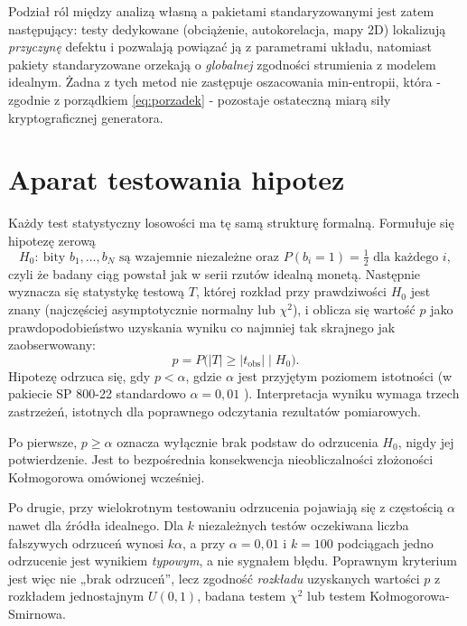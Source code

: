 Podział ról między analizą własną a pakietami standaryzowanymi jest zatem
następujący: testy dedykowane (obciążenie, autokorelacja, mapy 2D)
lokalizują \emph{przyczynę} defektu i pozwalają powiązać ją z parametrami
układu, natomiast pakiety standaryzowane orzekają o \emph{globalnej}
zgodności strumienia z modelem idealnym. Żadna z tych metod nie zastępuje
oszacowania min-entropii, która - zgodnie z porządkiem
\eqref{eq:porzadek} - pozostaje ostateczną miarą siły kryptograficznej
generatora.

\section{Aparat testowania hipotez}

Każdy test statystyczny losowości ma tę samą strukturę formalną. Formułuje
się hipotezę zerową
%
\begin{equation}
  H_0:\ \text{bity } b_1,\dots,b_N \text{ są wzajemnie niezależne oraz }
  P(b_i = 1) = \tfrac{1}{2} \text{ dla każdego } i,
  \label{eq:h0}
\end{equation}
%
czyli że badany ciąg powstał jak w serii rzutów idealną monetą. Następnie
wyznacza się statystykę testową $T$, której rozkład przy prawdziwości $H_0$
jest znany (najczęściej asymptotycznie normalny lub $\chi^2$), i oblicza się
wartość $p$ jako prawdopodobieństwo uzyskania wyniku co najmniej tak
skrajnego jak zaobserwowany:
%
\begin{equation}
  p = P\big(|T| \ge |t_{\mathrm{obs}}| \;\big|\; H_0\big).
  \label{eq:pvalue}
\end{equation}
%
Hipotezę odrzuca się, gdy $p < \alpha$, gdzie $\alpha$ jest przyjętym
poziomem istotności (w pakiecie SP 800-22 standardowo $\alpha = 0{,}01$
\cite{rukhin2010sp80022}). Interpretacja wyniku wymaga trzech zastrzeżeń,
istotnych dla poprawnego odczytania rezultatów pomiarowych.

Po pierwsze, $p \ge \alpha$ oznacza wyłącznie brak podstaw do odrzucenia
$H_0$, nigdy jej potwierdzenie. Jest to bezpośrednia konsekwencja
nieobliczalności złożoności Kołmogorowa omówionej wcześniej.

Po drugie, przy wielokrotnym testowaniu odrzucenia pojawiają się
z częstością $\alpha$ nawet dla źródła idealnego. Dla $k$ niezależnych testów
oczekiwana liczba fałszywych odrzuceń wynosi $k\alpha$, a przy $\alpha = 0{,}01$
i $k = 100$ podciągach jedno odrzucenie jest wynikiem \emph{typowym}, a nie
sygnałem błędu. Poprawnym kryterium jest więc nie „brak odrzuceń”, lecz
zgodność \emph{rozkładu} uzyskanych wartości $p$ z rozkładem jednostajnym
$U(0,1)$, badana testem $\chi^2$ lub testem Kołmogorowa-Smirnowa.


